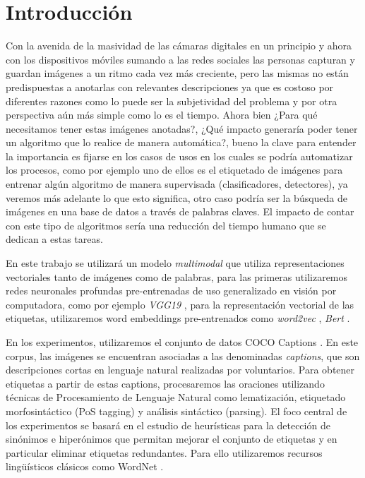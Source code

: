\chapter{Introducción}


Con la avenida de la masividad de las cámaras digitales en un principio y ahora con los dispositivos móviles sumando a las redes sociales las personas capturan y guardan imágenes a un ritmo cada vez más creciente, pero las mismas no están predispuestas a anotarlas con relevantes descripciones ya que es costoso por diferentes razones como lo puede ser la subjetividad del problema y por otra perspectiva aún más simple como lo es el tiempo. Ahora bien ¿Para qué necesitamos tener estas imágenes anotadas?, ¿Qué impacto generaría poder tener un algoritmo que lo realice de manera automática?, bueno la clave para entender la importancia es fijarse en los casos de usos en los cuales se podría automatizar los procesos, como por ejemplo uno de ellos es el etiquetado de imágenes para entrenar algún algoritmo de manera supervisada (clasificadores, detectores), ya veremos más adelante lo que esto significa, otro caso podría ser la búsqueda de imágenes en una base de datos a través de palabras claves. El impacto de contar con este tipo de algoritmos sería una reducción del tiempo humano que se dedican a estas tareas.

En este trabajo se utilizará un modelo \textit{multimodal} que utiliza representaciones vectoriales tanto de imágenes como de palabras, para las primeras utilizaremos redes neuronales profundas pre-entrenadas de uso generalizado en visión por computadora, como por ejemplo \textit{VGG19} \cite{VGG}, para la representación vectorial de las etiquetas, utilizaremos word embeddings pre-entrenados como \textit{word2vec} \cite{mikolov2013efficient}, \textit{Bert} \cite{devlin2018bert}.

En los experimentos, utilizaremos el conjunto de datos COCO Captions \cite{chen2015microsoft}. En este corpus, las imágenes se encuentran asociadas a las denominadas \textit{captions}, que son descripciones cortas en lenguaje natural realizadas por voluntarios. Para obtener etiquetas a partir de estas captions, procesaremos las oraciones utilizando técnicas de Procesamiento de Lenguaje Natural como lematización, etiquetado morfosintáctico (PoS tagging) y análisis sintáctico (parsing). El foco central de los experimentos se basará en el estudio de heurísticas para la detección de sinónimos e hiperónimos que permitan mejorar el conjunto de etiquetas y en particular eliminar etiquetas redundantes. Para ello utilizaremos recursos lingüísticos clásicos como WordNet \cite{worNet}.

